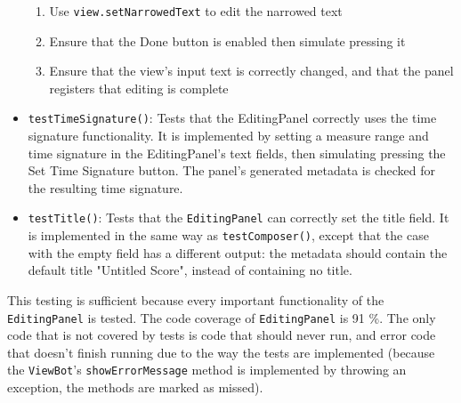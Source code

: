 \documentclass[11pt]{article}
\begin{document}
\begin{itemize}
\begin{enumerate}
\item Use \texttt{view.setNarrowedText} to edit the narrowed text\\
\item Ensure that the Done button is enabled then simulate pressing it\\
\item Ensure that the view's input text is correctly changed, and that the panel registers that editing is complete\\
\end{enumerate}
\item \texttt{testTimeSignature()}: Tests that the EditingPanel correctly uses the time signature functionality.  It is implemented by setting a measure range and time signature in the EditingPanel's text fields, then simulating pressing the Set Time Signature button.  The panel's generated metadata is checked for the resulting time signature.\\
\item \texttt{testTitle()}: Tests that the \texttt{EditingPanel} can correctly set the title field.  It is implemented in the same way as \texttt{testComposer()}, except that the case with the empty field has a different output: the metadata should contain the default title "Untitled Score", instead of containing no title.\\
\end{itemize}

This testing is sufficient because every important functionality of the \texttt{EditingPanel} is tested.  The code coverage of \texttt{EditingPanel} is 91 \%.  The only code that is not covered by tests is code that should never run, and error code that doesn't finish running due to the way the tests are implemented (because the \texttt{ViewBot}'s \texttt{showErrorMessage} method is implemented by throwing an exception, the methods are marked as missed).\\
\end{document}
